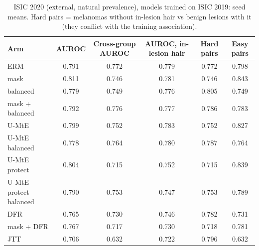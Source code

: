 \begin{table}[H]\centering\scriptsize
\caption{ISIC 2020 (external, natural prevalence), models trained on ISIC 2019: seed means. Hard pairs = melanomas without in-lesion hair vs benign lesions with it (they conflict with the training association).}\label{tab:r10m}
\begin{tabular}{lccccc}\toprule
Arm & AUROC & Cross-group AUROC & AUROC, in-lesion hair & Hard pairs & Easy pairs \\\midrule
ERM & 0.791 & 0.772 & 0.779 & 0.772 & 0.798 \\
mask & 0.811 & 0.746 & 0.781 & 0.746 & 0.843 \\
balanced & 0.779 & 0.749 & 0.776 & 0.805 & 0.749 \\
mask + balanced & 0.792 & 0.776 & 0.777 & 0.786 & 0.783 \\
U-MtE & 0.799 & 0.752 & 0.783 & 0.752 & 0.827 \\
U-MtE balanced & 0.778 & 0.764 & 0.780 & 0.787 & 0.764 \\
U-MtE protect & 0.804 & 0.715 & 0.752 & 0.715 & 0.839 \\
U-MtE protect balanced & 0.790 & 0.753 & 0.747 & 0.753 & 0.789 \\
DFR & 0.765 & 0.730 & 0.746 & 0.782 & 0.731 \\
mask + DFR & 0.767 & 0.717 & 0.730 & 0.718 & 0.781 \\
JTT & 0.706 & 0.632 & 0.722 & 0.796 & 0.632 \\
\bottomrule\end{tabular}
\end{table}
